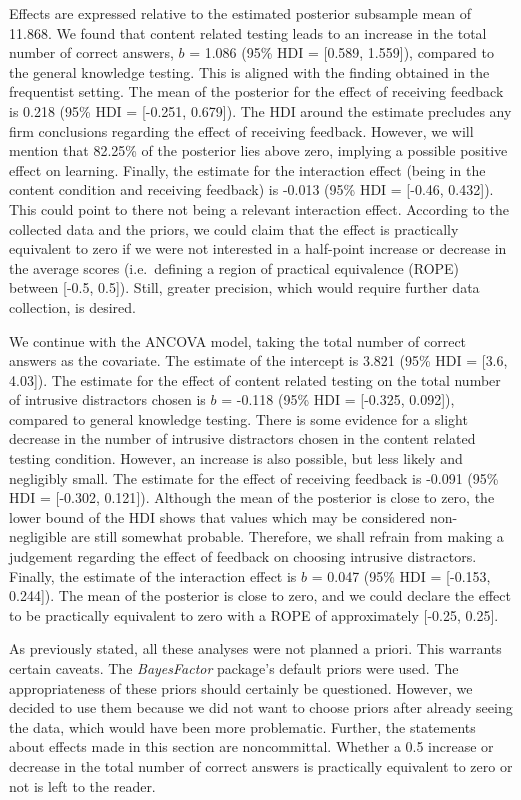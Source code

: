 \documentclass[../main.tex]{subfiles}
\begin{document}
Effects are expressed relative to the estimated posterior subsample mean
of 11.868. We found that content related testing leads to an increase in
the total number of correct answers, \(b\) = 1.086 (95\% HDI = {[}0.589,
1.559{]}), compared to the general knowledge testing. This is aligned
with the finding obtained in the frequentist setting. The mean of the
posterior for the effect of receiving feedback is 0.218 (95\% HDI =
{[}-0.251, 0.679{]}). The HDI around the estimate precludes any firm
conclusions regarding the effect of receiving feedback. However, we will
mention that 82.25\% of the posterior lies above zero, implying a
possible positive effect on learning. Finally, the estimate for the
interaction effect (being in the content condition and receiving
feedback) is -0.013 (95\% HDI = {[}-0.46, 0.432{]}). This could point to
there not being a relevant interaction effect. According to the
collected data and the priors, we could claim that the effect is
practically equivalent to zero if we were not interested in a half-point
increase or decrease in the average scores (i.e.~defining a region of
practical equivalence (ROPE) between {[}-0.5, 0.5{]}). Still, greater
precision, which would require further data collection, is desired.

We continue with the ANCOVA model, taking the total number of correct
answers as the covariate. The estimate of the intercept is 3.821 (95\%
HDI = {[}3.6, 4.03{]}). The estimate for the effect of content related
testing on the total number of intrusive distractors chosen is \(b\) =
-0.118 (95\% HDI = {[}-0.325, 0.092{]}), compared to general knowledge
testing. There is some evidence for a slight decrease in the number of
intrusive distractors chosen in the content related testing condition.
However, an increase is also possible, but less likely and negligibly
small. The estimate for the effect of receiving feedback is -0.091 (95\%
HDI = {[}-0.302, 0.121{]}). Although the mean of the posterior is close
to zero, the lower bound of the HDI shows that values which may be
considered non-negligible are still somewhat probable. Therefore, we
shall refrain from making a judgement regarding the effect of feedback
on choosing intrusive distractors. Finally, the estimate of the
interaction effect is \(b\) = 0.047 (95\% HDI = {[}-0.153, 0.244{]}).
The mean of the posterior is close to zero, and we could declare the
effect to be practically equivalent to zero with a ROPE of approximately
{[}-0.25, 0.25{]}.

As previously stated, all these analyses were not planned a priori. This
warrants certain caveats. The \textit{BayesFactor} package's default
priors were used. The appropriateness of these priors should certainly
be questioned. However, we decided to use them because we did not want
to choose priors after already seeing the data, which would have been
more problematic. Further, the statements about effects made in this
section are noncommittal. Whether a 0.5 increase or decrease in the
total number of correct answers is practically equivalent to zero or not
is left to the reader.
\end{document}
